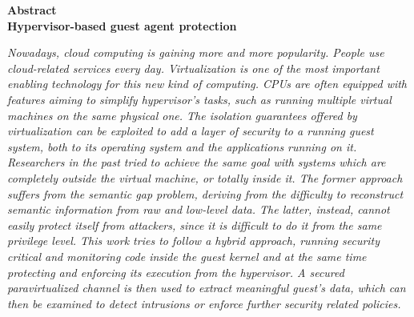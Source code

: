 \thispagestyle{plain}
\begin{center}
    \Large
    \textbf{Abstract} \\
    \vspace{1cm}
    \textbf{Hypervisor-based guest agent protection}
    

 
\end{center}
\textit{Nowadays, cloud computing is gaining more and more popularity. People use cloud-related services every day. Virtualization is one of the most important enabling technology for this new kind of computing. CPUs are often equipped with features aiming to simplify hypervisor's tasks, such as running multiple virtual machines on the same physical one. The isolation guarantees offered by virtualization can be exploited to add a layer of security to a running guest system, both to its operating system and the applications running on it. Researchers in the past tried to achieve the same goal with systems which are completely outside the virtual machine, or totally inside it. The former approach suffers from the semantic gap problem, deriving from the difficulty to reconstruct semantic information from raw and low-level data. The latter, instead, cannot easily protect itself from attackers, since it is difficult to do it from the same privilege level. This work tries to follow a hybrid approach, running security critical and monitoring code inside the guest kernel and at the same time protecting and enforcing its execution from the hypervisor. A secured paravirtualized channel is then used to extract meaningful guest's data, which can then be examined to detect intrusions or enforce further security related policies.}

